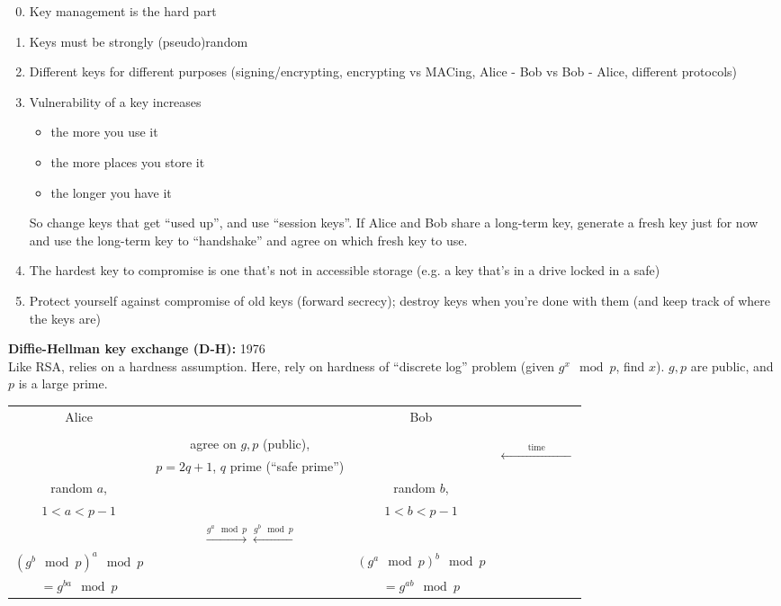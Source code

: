 \begin{enumerate}
\setcounter{enumi}{-1}
    \item Key management is the hard part
    \item Keys must be strongly (pseudo)random
    \item Different keys for different purposes (signing/encrypting, encrypting
        vs MACing, Alice - Bob vs Bob - Alice, different protocols)
    \item Vulnerability of a key increases
    \begin{itemize}
        \item the more you use it
        \item the more places you store it
        \item the longer you have it
    \end{itemize}
    So change keys that get ``used up'', and use ``session keys''. If Alice and
    Bob share a long-term key, generate a fresh key just for now and use the
    long-term key to ``handshake'' and agree on which fresh key to use.
    \item The hardest key to compromise is one that's not in accessible storage
        (e.g. a key that's in a drive locked in a safe)
    \item Protect yourself against compromise of old keys (forward secrecy);
        destroy keys when you're done with them (and keep track of where the
        keys are)
\end{enumerate}

{\bf Diffie-Hellman key exchange (D-H):} 1976\\
Like RSA, relies on a hardness assumption. Here, rely on hardness of ``discrete
log'' problem (given $g^x \mod p$, find $x$). $g,p$ are public, and $p$ is a
large prime.

\begin{table}[h!]
\centering
\begin{tabular}{cccc}
Alice & & Bob & \\
\cline{1-3} & & & \multirow{8}{*}{\begin{sideways}$\xleftarrow{\quad\qquad\text{time}\qquad\quad}$\end{sideways}}\\
& agree on $g,p$ (public), & & \\
& $p = 2q+1$, $q$ prime (``safe prime'') & & \\
random $a$, & & random $b$, & \\
$1 < a < p-1$ & & $1 < b < p-1$ & \\
& $\xrightarrow{g^a \mod p} \xleftarrow{g^b \mod p}$ & & \\
$\left(g^b \mod p\right)^a \mod p$ & & $\left(g^a \mod p\right)^b \mod p$ & \\
$= g^{ba} \mod p$ & & $= g^{ab} \mod p$ &
\end{tabular}
\end{table}

